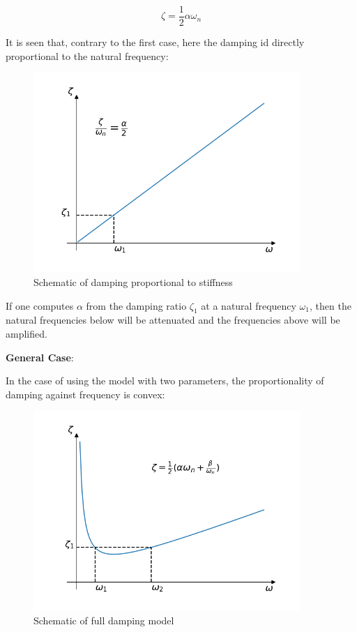 \documentclass[10pt,b5paper,titlepage]{book}
\begin{document}
\begin{equation}
    \zeta = \frac{1}{2} \alpha \omega_n
\end{equation}

It is seen that, contrary to the first case, here the damping id directly proportional
to the natural frequency:

\begin{figure}[ht]
    \centering
    \includegraphics[width=0.90\textwidth]{img/stiffness_dependent_damping.png}
    \caption{Schematic of damping proportional to stiffness}
    \label{fig:stiffness-dependent-damping-png}
\end{figure}

If one computes $ \alpha $ from the damping ratio $ \zeta_1 $ at a natural
frequency $ \omega_1 $, then the natural frequencies below will be attenuated and
the frequencies above will be amplified.

\textbf{General Case}:

In the case of using the model with two parameters, the proportionality of damping
against frequency is convex:

\begin{figure}[ht]
    \centering
    \includegraphics[width=0.90\textwidth]{img/general_rayleigh_damping.png}
    \caption{Schematic of full damping model}
    \label{fig:general-rayleigh-damping-png}
\end{figure}
\end{document}
